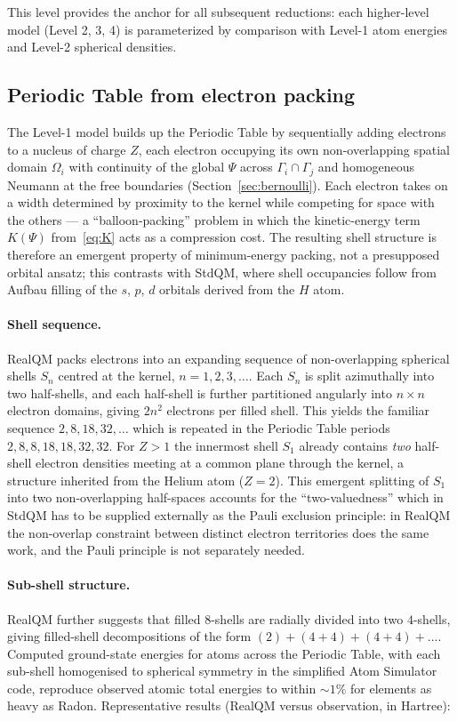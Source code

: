 \documentclass[11pt]{article}
\begin{document}
This level provides the anchor for all subsequent reductions: each higher-level model (Level 2, 3, 4) is parameterized by comparison with Level-1 atom energies and Level-2 spherical densities.

\subsection{Periodic Table from electron packing}\label{sec:pt-packing}

The Level-1 model builds up the Periodic Table by sequentially adding electrons to a nucleus of charge $Z$, each electron occupying its own non-overlapping spatial domain $\Omega_i$ with continuity of the global $\Psi$ across $\Gamma_i \cap \Gamma_j$ and homogeneous Neumann at the free boundaries (Section~\ref{sec:bernoulli}). Each electron takes on a width determined by proximity to the kernel while competing for space with the others --- a ``balloon-packing'' problem in which the kinetic-energy term $K(\Psi)$ from~\eqref{eq:K} acts as a compression cost. The resulting shell structure is therefore an emergent property of minimum-energy packing, not a presupposed orbital ansatz; this contrasts with StdQM, where shell occupancies follow from Aufbau filling of the $s$, $p$, $d$ orbitals derived from the $H$ atom.

\paragraph{Shell sequence.}
RealQM packs electrons into an expanding sequence of non-overlapping spherical shells $S_n$ centred at the kernel, $n = 1, 2, 3, \ldots$. Each $S_n$ is split azimuthally into two half-shells, and each half-shell is further partitioned angularly into $n \times n$ electron domains, giving $2 n^2$ electrons per filled shell. This yields the familiar sequence $2, 8, 18, 32, \ldots$ which is repeated in the Periodic Table periods $2, 8, 8, 18, 18, 32, 32$. For $Z > 1$ the innermost shell $S_1$ already contains \emph{two} half-shell electron densities meeting at a common plane through the kernel, a structure inherited from the Helium atom ($Z = 2$). This emergent splitting of $S_1$ into two non-overlapping half-spaces accounts for the ``two-valuedness'' which in StdQM has to be supplied externally as the Pauli exclusion principle: in RealQM the non-overlap constraint between distinct electron territories does the same work, and the Pauli principle is not separately needed.

\paragraph{Sub-shell structure.}
RealQM further suggests that filled $8$-shells are radially divided into two $4$-shells, giving filled-shell decompositions of the form $(2) + (4{+}4) + (4{+}4) + \ldots$. Computed ground-state energies for atoms across the Periodic Table, with each sub-shell homogenised to spherical symmetry in the simplified Atom Simulator code, reproduce observed atomic total energies to within ${\sim}1\%$ for elements as heavy as Radon. Representative results (RealQM versus observation, in Hartree):
\end{document}

